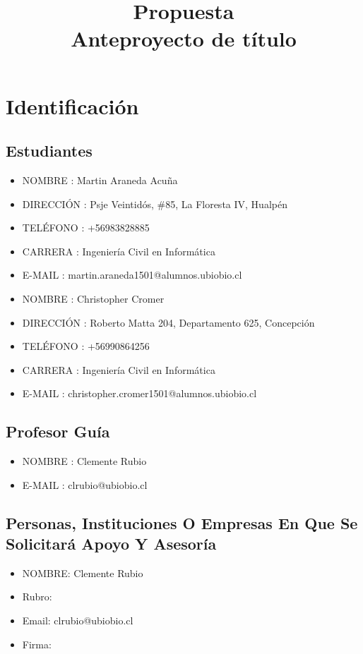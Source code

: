 \documentclass[spanish]{article}
\begin{document}
	\title{Propuesta\\Anteproyecto de título}
	\maketitle

\section{Identificación}
\subsection{Estudiantes}
\begin{itemize}
		\item NOMBRE : Martin Araneda Acuña
		\item DIRECCIÓN : Psje Veintidós, \#85, La Floresta IV, Hualpén
		\item TELÉFONO : +56983828885
        \item CARRERA : Ingeniería Civil en Informática
		\item E-MAIL : martin.araneda1501@alumnos.ubiobio.cl
\end{itemize}
\vspace{2mm}
\begin{itemize}
    \item NOMBRE : Christopher Cromer
    \item DIRECCIÓN : Roberto Matta 204, Departamento 625, Concepción
    \item TELÉFONO : +56990864256
    \item CARRERA : Ingeniería Civil en Informática
    \item E-MAIL : christopher.cromer1501@alumnos.ubiobio.cl
\end{itemize}

\subsection{Profesor Guía}
	\begin{itemize}
		\item NOMBRE : Clemente Rubio
		\item E-MAIL : clrubio@ubiobio.cl
	\end{itemize}

\subsection{Personas, Instituciones O Empresas En Que Se Solicitará Apoyo Y Asesoría}
	\begin{itemize}
		\item NOMBRE: Clemente Rubio
		\item Rubro:
		\item Email: clrubio@ubiobio.cl
		\item Firma:
	\end{itemize}
\end{document}
